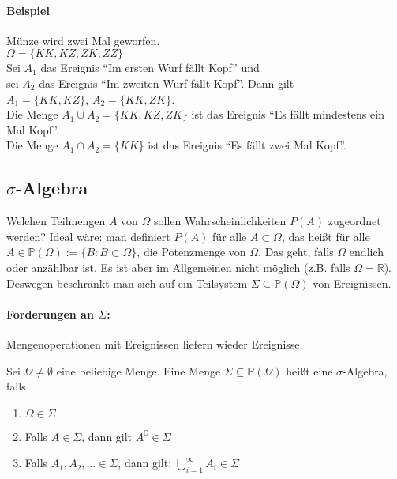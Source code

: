\paragraph{Beispiel} Münze wird zwei Mal geworfen.\\
$\Omega = \{KK, KZ, ZK, ZZ\}$\\
Sei $A_1$ das Ereignis \enquote{Im ersten Wurf fällt Kopf} und\\
sei $A_2$ das Ereignis \enquote{Im zweiten Wurf fällt Kopf}. Dann gilt\\
$A_1 = \{KK, KZ\}$, $A_2 = \{KK, ZK\}$.\\
Die Menge $A_1 \cup A_2 = \{KK, KZ, ZK\}$ ist das Ereignis \enquote{Es fällt mindestens ein Mal
Kopf}.\\
Die Menge $A_1 \cap A_2 = \{KK\}$ ist das Ereignis \enquote{Es fällt zwei Mal Kopf}.\\


\subsection{$\sigma$-Algebra}
Welchen Teilmengen $A$ von $\Omega$ sollen Wahrscheinlichkeiten $P(A)$ zugeordnet werden?
Ideal wäre: man definiert $P(A)$ für alle $A \subset \Omega$, das heißt für alle
$A \in \mathbb{P}(\Omega) := \{B:B\subset\Omega\}$, die Potenzmenge von $\Omega$.
Das geht, falls $\Omega$ endlich oder anzählbar ist.
Es ist aber im Allgemeinen nicht möglich
(z.B. falls $\Omega = \mathbb{R}$).
Deswegen beschränkt man sich auf ein Teilsystem $\Sigma \subseteq \mathbb{P}(\Omega)$ von
Ereignissen.
\paragraph{Forderungen an $\Sigma$:}
Mengenoperationen mit Ereignissen liefern wieder Ereignisse.

\begin{definition}
    Sei $\Omega \neq \emptyset$ eine beliebige Menge.
    Eine Menge $\Sigma \subseteq \mathbb{P}(\Omega)$ heißt eine $\sigma$-Algebra, falls
    \begin{enumerate}
        \item $\Omega \in \Sigma$
        \item Falls $A \in \Sigma$, dann gilt $A^\complement \in \Sigma$
        \item Falls $A_1, A_2, \dots \in \Sigma$, dann gilt:
            $\bigcup\limits_{i=1}^\infty A_i \in \Sigma$
    \end{enumerate}
\end{definition}

